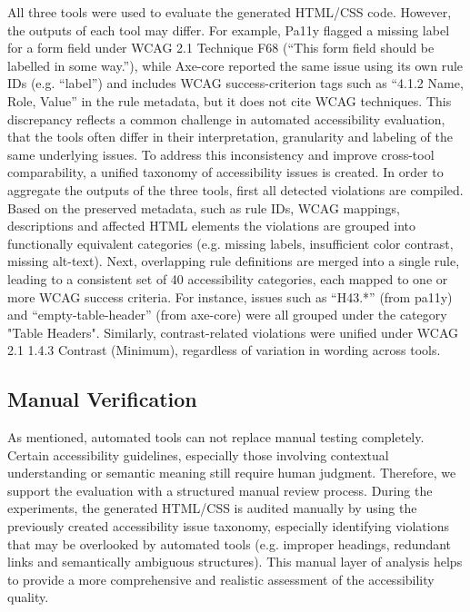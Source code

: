 All three tools were used to evaluate the generated HTML/CSS code. 
However, the outputs of each tool may differ. For example, 
Pa11y flagged a missing label for a form field under WCAG
2.1 Technique F68 (“This form field should be labelled in some way.”), 
while Axe-core
reported the same issue using its own rule IDs (e.g. “label”) and includes 
WCAG success-criterion
tags such as “4.1.2 Name, Role, Value” in the rule metadata, but it does not cite WCAG
techniques. This discrepancy reflects a common challenge in automated accessibility evaluation,
that the tools often differ in their interpretation, granularity and labeling of the same underlying
issues.\newline
To address this inconsistency and improve cross-tool comparability, a 
unified taxonomy of accessibility issues is created. In order to 
aggregate the outputs of the three tools, first all 
detected violations are compiled. Based on the preserved 
metadata, such as rule IDs, WCAG mappings, descriptions and affected
HTML elements the violations are grouped into functionally 
equivalent categories (e.g. missing labels, insufficient color contrast,
missing alt-text). Next, overlapping rule definitions are merged 
into a single rule, leading to a consistent set of 40 
accessibility categories, each mapped to one or more WCAG 
success criteria. For instance, issues such as “H43.*” 
(from pa11y) and “empty-table-header” (from axe-core) were all
grouped under the category "Table Headers". Similarly, 
contrast-related violations were unified
under WCAG 2.1 1.4.3 Contrast (Minimum), 
regardless of variation in wording across tools.

\subsection{Manual Verification}
As mentioned, automated tools can not replace manual testing completely. 
Certain accessibility guidelines, especially those involving 
contextual understanding or semantic meaning still require 
human judgment. Therefore, we support the evaluation with a 
structured manual review process. During the experiments, the 
generated HTML/CSS is audited manually by using the previously 
created accessibility issue taxonomy, especially identifying 
violations that may be overlooked by automated tools 
(e.g. improper headings, redundant links and semantically 
ambiguous structures). This manual layer of analysis helps 
to provide a more comprehensive and realistic assessment of
the accessibility quality.